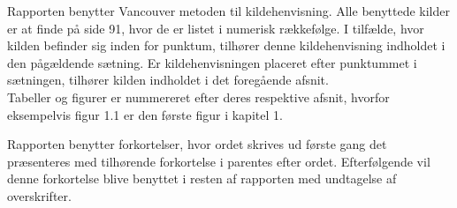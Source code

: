 Rapporten benytter Vancouver metoden til kildehenvisning. Alle benyttede kilder er at finde på side 91, hvor de er listet i numerisk rækkefølge. I tilfælde, hvor kilden befinder sig inden for punktum, tilhører denne kildehenvisning indholdet i den pågældende sætning. Er kildehenvisningen placeret efter punktummet i sætningen, tilhører kilden indholdet i det foregående afsnit. \\
Tabeller og figurer er nummereret efter deres respektive afsnit, hvorfor eksempelvis figur 1.1 er den første figur i kapitel 1.

Rapporten benytter forkortelser, hvor ordet skrives ud første gang det præsenteres med tilhørende forkortelse i parentes efter ordet. Efterfølgende vil denne forkortelse blive benyttet i resten af rapporten med undtagelse af overskrifter. 
